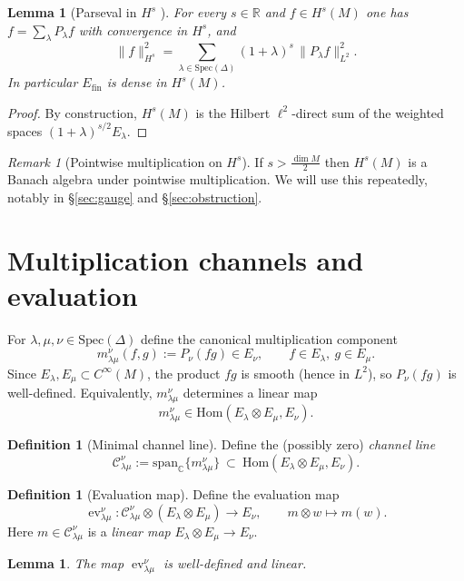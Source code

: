 \documentclass[11pt]{amsart}
\theoremstyle{plain}
\newtheorem{lemma}[theorem]{Lemma}
\theoremstyle{definition}
\newtheorem{definition}[theorem]{Definition}
\theoremstyle{remark}
\newtheorem{remark}[theorem]{Remark}
\newcommand{\Spec}{\mathrm{Spec}}
\newcommand{\Hom}{\mathrm{Hom}}
\newcommand{\bbC}{\mathbb{C}}
\newcommand{\bbR}{\mathbb{R}}
\newcommand{\cC}{\mathcal{C}}
\DeclareMathOperator{\ev}{ev}
\begin{document}
\begin{lemma}[Parseval in $H^s$ \cite{Taylor2011}]\label{lem:parseval-Hs}
For every $s\in\bbR$ and $f\in H^s(M)$ one has $f=\sum_{\lambda}P_\lambda f$ with convergence in $H^s$, and
\[ \|f\|_{H^s}^2=\sum_{\lambda\in\Spec(\Delta)} (1+\lambda)^s\,\|P_\lambda f\|_{L^2}^2. \]
In particular $E_{\mathrm{fin}}$ is dense in $H^s(M)$.
\end{lemma}

\begin{proof}
By construction, $H^s(M)$ is the Hilbert $\ell^2$-direct sum of the weighted spaces $(1+\lambda)^{s/2}E_\lambda$.
\end{proof}

\begin{remark}[Pointwise multiplication on $H^s$]
If $s>\frac{\dim M}{2}$ then $H^s(M)$ is a Banach algebra under pointwise multiplication.
We will use this repeatedly, notably in \S\ref{sec:gauge} and \S\ref{sec:obstruction}.
\end{remark}

\section{Multiplication channels and evaluation}

For $\lambda,\mu,\nu\in\Spec(\Delta)$ define the canonical multiplication component
\[ m^{\nu}_{\lambda\mu}(f,g):=P_\nu(fg) \in E_\nu,\qquad f\in E_\lambda,\ g\in E_\mu. \]
Since $E_\lambda,E_\mu\subset C^\infty(M)$, the product $fg$ is smooth (hence in $L^2$), so $P_\nu(fg)$ is well-defined.
Equivalently, $m^{\nu}_{\lambda\mu}$ determines a linear map
\[ m^{\nu}_{\lambda\mu}\in\Hom(E_\lambda\otimes E_\mu,E_\nu). \]

\begin{definition}[Minimal channel line]
Define the (possibly zero) \emph{channel line}
\[ \cC^{\nu}_{\lambda\mu}:=\mathrm{span}_{\bbC}\{m^{\nu}_{\lambda\mu}\}\ \subset\ \Hom(E_\lambda\otimes E_\mu,E_\nu). \]
\end{definition}

\begin{definition}[Evaluation map]\label{def:ev}
Define the evaluation map
\[ \ev^{\nu}_{\lambda\mu}:\cC^{\nu}_{\lambda\mu}\otimes(E_\lambda\otimes E_\mu)\to E_\nu,
\qquad m\otimes w\mapsto m(w). \]
Here $m\in\cC^{\nu}_{\lambda\mu}$ is a \emph{linear map} $E_\lambda\otimes E_\mu\to E_\nu$.
\end{definition}

\begin{lemma}\label{lem:ev-well}
The map $\ev^{\nu}_{\lambda\mu}$ is well-defined and linear.
\end{lemma}
\end{document}
